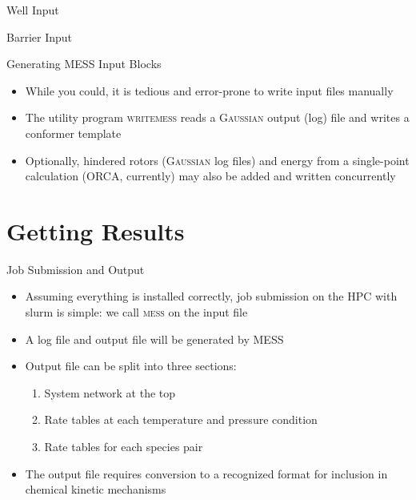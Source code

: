 \documentclass[10pt,presentation]{beamer}
\begin{document}
\begin{frame}[fragile]{Well Input}
  \vspace{-0.8cm}
  \tiny{
  
  }
\end{frame}

\begin{frame}[fragile]{Barrier Input}
  \vspace{-0.8cm}
  \tiny{
  
  }
\end{frame}

\begin{frame}{Generating \textsc{MESS} Input Blocks}
  \begin{itemize}
   \item While you could, it is tedious and error-prone to write input files manually
   \item The utility program \textsc{writemess} reads a \textsc{Gaussian} output (log) file and writes a conformer template
   \item Optionally, hindered rotors (\textsc{Gaussian} log files) and energy from a single-point calculation (\textsc{ORCA}, currently) may also be added and written concurrently
  \end{itemize}
\end{frame}

\section{Getting Results}
\begin{frame}{Job Submission and Output}
  \begin{itemize}
   \item Assuming everything is installed correctly, job submission on the HPC with slurm is simple: we call \textsc{mess} on the input file
   \item A log file and output file will be generated by \textsc{MESS}
   \item Output file can be split into three sections:
    \begin{enumerate}
     \item System network at the top
     \item Rate tables at each temperature and pressure condition
     \item Rate tables for each species pair
    \end{enumerate}
   \item The output file requires conversion to a recognized format for inclusion in chemical kinetic mechanisms
  \end{itemize}
\end{frame}
\end{document}
